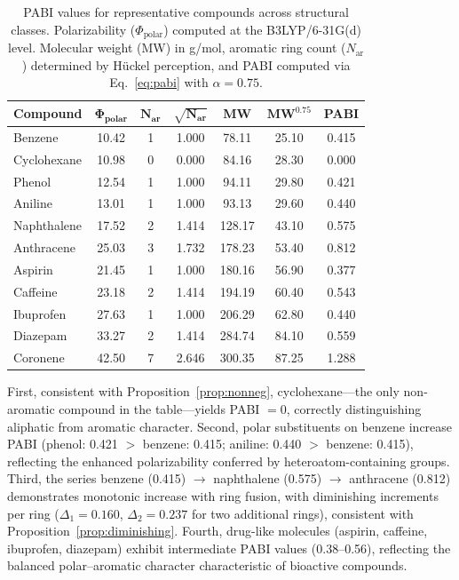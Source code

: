 \documentclass[12pt,a4paper]{article}
\begin{document}
\begin{table}[H]
\centering
\caption{PABI values for representative compounds across structural classes. Polarizability ($\Phi_{\text{polar}}$) computed at the B3LYP/6-31G(d) level. Molecular weight (MW) in g/mol, aromatic ring count ($N_{\text{ar}}$) determined by H\"{u}ckel perception, and PABI computed via Eq.~\eqref{eq:pabi} with $\alpha = 0.75$.}
\label{tab:pabi_values}
\begin{tabular}{@{}lcccccc@{}}
\toprule
\textbf{Compound} & $\mathbf{\Phi_{\text{polar}}}$ & $\mathbf{N_{\text{ar}}}$ & $\mathbf{\sqrt{N_{\text{ar}}}}$ & \textbf{MW} & $\mathbf{MW^{0.75}}$ & \textbf{PABI} \\
\midrule
Benzene & 10.42 & 1 & 1.000 & 78.11 & 25.10 & 0.415 \\
Cyclohexane & 10.98 & 0 & 0.000 & 84.16 & 28.30 & 0.000 \\
Phenol & 12.54 & 1 & 1.000 & 94.11 & 29.80 & 0.421 \\
Aniline & 13.01 & 1 & 1.000 & 93.13 & 29.60 & 0.440 \\
Naphthalene & 17.52 & 2 & 1.414 & 128.17 & 43.10 & 0.575 \\
Anthracene & 25.03 & 3 & 1.732 & 178.23 & 53.40 & 0.812 \\
Aspirin & 21.45 & 1 & 1.000 & 180.16 & 56.90 & 0.377 \\
Caffeine & 23.18 & 2 & 1.414 & 194.19 & 60.40 & 0.543 \\
Ibuprofen & 27.63 & 1 & 1.000 & 206.29 & 62.80 & 0.440 \\
Diazepam & 33.27 & 2 & 1.414 & 284.74 & 84.10 & 0.559 \\
Coronene & 42.50 & 7 & 2.646 & 300.35 & 87.25 & 1.288 \\
\bottomrule
\end{tabular}
\end{table}

First, consistent with Proposition~\ref{prop:nonneg}, cyclohexane---the only non-aromatic compound in the table---yields PABI $= 0$, correctly distinguishing aliphatic from aromatic character. Second, polar substituents on benzene increase PABI (phenol: 0.421 $>$ benzene: 0.415; aniline: 0.440 $>$ benzene: 0.415), reflecting the enhanced polarizability conferred by heteroatom-containing groups. Third, the series benzene (0.415) $\to$ naphthalene (0.575) $\to$ anthracene (0.812) demonstrates monotonic increase with ring fusion, with diminishing increments per ring ($\Delta_1 = 0.160$, $\Delta_2 = 0.237$ for two additional rings), consistent with Proposition~\ref{prop:diminishing}. Fourth, drug-like molecules (aspirin, caffeine, ibuprofen, diazepam) exhibit intermediate PABI values (0.38--0.56), reflecting the balanced polar--aromatic character characteristic of bioactive compounds.
\end{document}
